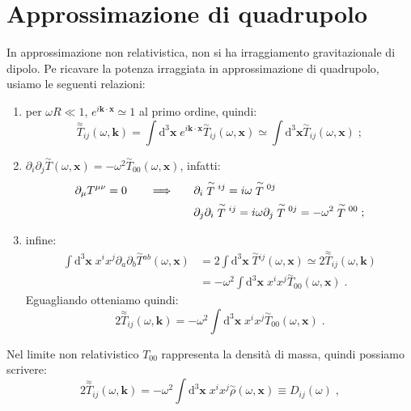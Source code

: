 \documentclass[12pt,a4paper]{report}
\theoremstyle{definition}
\newcommand{\diff}[1][]{\mathrm{d}#1}
\begin{document}
\section{Approssimazione di quadrupolo}
In approssimazione non relativistica, non si ha irraggiamento gravitazionale di dipolo. Pe ricavare la potenza irraggiata in approssimazione di quadrupolo, usiamo le seguenti relazioni:
\begin{enumerate}
\item per $\omega R\ll 1$, $e^{i\mathbf{k}\cdot\mathbf{x}}\simeq 1$ al primo ordine, quindi:
\begin{equation}
\stackrel{\approx}{T}_{ij}(\omega,\mathbf{k})=\int\diff^3{\mathbf{x}}\;e^{i\mathbf{k}\cdot\mathbf{x}}\stackrel{\sim}{T}_{ij}(\omega,\mathbf{x})\simeq \int\diff^3{\mathbf{x}}\stackrel{\sim}{T}_{ij}(\omega,\mathbf{x})\;;
\end{equation}
\item $\partial_i\partial_j\stackrel{\sim}{T}(\omega,\mathbf{x})=-\omega^2\stackrel{\sim}{T}_{00}(\omega,\mathbf{x})$, infatti:
\begin{align}
\partial_{\mu}T^{\mu\nu}=0\qquad \Longrightarrow\qquad &\partial_i\stackrel{\sim}{T}{}^{ij}=i\omega\stackrel{\sim}{T}{}^{0j} \notag \\
&\partial_j\partial_i\stackrel{\sim}{T}{}^{ij}=i\omega\partial_j\stackrel{\sim}{T}{}^{0j}=-\omega^2\stackrel{\sim}{T}{}^{00}\;;
\end{align}
\item infine:
\begin{align*}
\int\diff^3{\mathbf{x}}\;x^ix^j\partial_a\partial_b\stackrel{\sim}{T}{}^{ab}(\omega,\mathbf{x})&=2\int\diff^3{\mathbf{x}}\;\stackrel{\sim}{T}{}^{ij}(\omega,\mathbf{x})\simeq 2\stackrel{\approx}{T}_{ij}(\omega,\mathbf{k}) \\
&=-\omega^2\int\diff^3{\mathbf{x}}\;x^ix^j\stackrel{\sim}{T}_{00}(\omega,\mathbf{x})\;.
\end{align*}
Eguagliando otteniamo quindi:
\begin{equation}
2\stackrel{\approx}{T}_{ij}(\omega,\mathbf{k})=-\omega^2\int\diff^3{\mathbf{x}}\;x^ix^j\stackrel{\sim}{T}_{00}(\omega,\mathbf{x})\;.
\end{equation}
\end{enumerate}
Nel limite non relativistico $T_{00}$ rappresenta la densità di massa, quindi possiamo scrivere:
\begin{equation}
2\stackrel{\approx}{T}_{ij}(\omega,\mathbf{k})=-\omega^2\int\diff^3{\mathbf{x}}\;x^ix^j\stackrel{\sim}{\rho}(\omega,\mathbf{x})\equiv D_{ij}(\omega)\;,
\end{equation}
\end{document}
